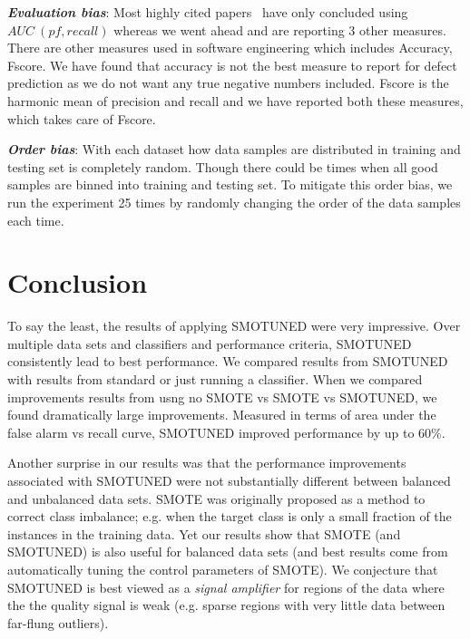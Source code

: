 \documentclass[10pt,conference]{IEEEtran}
\theoremstyle{break}
\theoremstyle{break}
\newcommand{\tion}[1]{{\S}\ref{sect:#1}}
\newcommand{\sma}{{\sc SMOTE}}
\newcommand{\smb}{{\sc SMOTUNED}}
\begin{document}
\textbf{\textit{Evaluation bias}}: Most highly cited papers~\cite{ghotra2015revisiting,tantithamthavorn2016automated} have only concluded using $AUC\ (pf, recall)$ whereas we went ahead and are reporting 3 other measures. There are other measures used in software engineering which includes Accuracy, Fscore. We have found that accuracy is not the best measure to report for defect prediction as we do not want any true negative numbers included. Fscore is the harmonic mean of precision and recall and we have reported both these measures, which takes care of Fscore.


\textbf{\textit{Order bias}}: With each dataset how data samples are distributed in training and testing set is completely random. Though there could be times when all good samples are binned into training and testing set. To mitigate this order bias, we run
the experiment 25 times by randomly changing the order of the data samples each time.

\section{Conclusion}
\label{sect:conclusion}

To say the least, the results of applying {\smb}  were very impressive.
Over multiple data sets and  classifiers and performance  criteria,  {\smb} consistently
lead to best performance. We compared results from {\smb} with results  from standard or just running a classifier. When we compared improvements
results from usng no SMOTE vs SMOTE vs {\smb}, we found dramatically large improvements.
Measured in terms
of area under the false alarm vs recall curve, {\smb} improved performance by up to 60\%.

Another surprise in our results was that the performance improvements associated with {\smb} were not substantially different between balanced and unbalanced data sets.
 {\sma} was originally proposed as a method to correct class imbalance; e.g. when the target class is only a small fraction of the instances in the training data.
 Yet our results show that SMOTE (and SMOTUNED) is also useful for balanced data sets (and best results come from automatically tuning the control parameters of SMOTE). We conjecture that SMOTUNED
is best viewed as a   {\em signal amplifier} for regions of the data where the the quality signal is weak  (e.g. sparse regions with very little data between far-flung outliers). 
\end{document}
